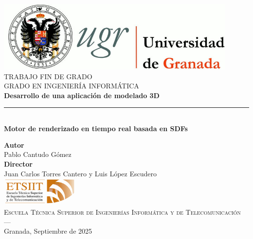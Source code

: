 \begin{titlepage}
\newlength{\centeroffset}
\setlength{\centeroffset}{-0.5\oddsidemargin}
\addtolength{\centeroffset}{0.5\evensidemargin}
\thispagestyle{empty}

\noindent\hspace*{\centeroffset}\begin{minipage}{\textwidth}

\centering
\includegraphics[width=0.9\textwidth]{logos/logo_ugr.jpg}\\[1.4cm]

\textsc{ \Large TRABAJO FIN DE GRADO\\[0.2cm]}
\textsc{ GRADO EN INGENIERÍA INFORMÁTICA}\\[1cm]
{\Huge\bfseries Desarrollo de una aplicación de modelado 3D \\}
\noindent\rule[-1ex]{\textwidth}{3pt}\\[3.5ex]
{\large\bfseries Motor de renderizado en tiempo real basada en SDFs }
\end{minipage}

\vspace{2.5cm}
\noindent\hspace*{\centeroffset}
\begin{minipage}{\textwidth}
\centering

\textbf{Autor}\\ {Pablo Cantudo Gómez}\\[2.5ex]
\textbf{Director}\\ {Juan Carlos Torres Cantero y Luis López Escudero}\\[2cm]
\includegraphics[width=0.3\textwidth]{logos/etsiit_logo.png}\\[0.1cm]
\textsc{Escuela Técnica Superior de Ingenierías Informática y de Telecomunicación}\\
\textsc{---}\\
Granada, Septiembre de 2025
\end{minipage}
\end{titlepage}
